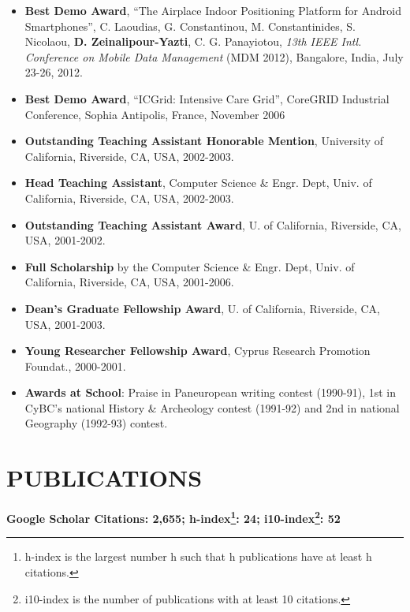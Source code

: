 \documentclass[10pt]{article}
\begin{document}
\begin{itemize}
\item  {\bf Best Demo Award}, ``The Airplace Indoor Positioning Platform for Android Smartphones'', C. Laoudias, G. Constantinou, M. Constantinides, S. Nicolaou, {\bf D. Zeinalipour-Yazti}, C. G. Panayiotou, {\em 13th IEEE Intl. Conference on Mobile Data Management}  (MDM 2012), Bangalore, India, July 23-26, 2012.
\item   {\bf Best Demo Award}, ``ICGrid: Intensive Care Grid'',
CoreGRID Industrial Conference, Sophia Antipolis, France,  November 2006
\item  {\bf Outstanding Teaching Assistant Honorable Mention}, University of California, Riverside, CA, USA,		2002-2003.
\item  {\bf Head Teaching Assistant}, Computer Science \& Engr. Dept, Univ. of California, Riverside, CA, USA,    2002-2003.
\item  {\bf Outstanding Teaching Assistant Award}, U. of California, Riverside, CA, USA, 			2001-2002.
\item  {\bf Full Scholarship} by the Computer Science \& Engr. Dept, Univ. of California, Riverside, CA, USA,	2001-2006.
\item  {\bf Dean's Graduate Fellowship Award}, U. of California, Riverside, CA, USA,				2001-2003.
\item  {\bf Young Researcher Fellowship Award}, Cyprus Research Promotion Foundat.,	2000-2001.
\item  {\bf Awards at School}: Praise in Paneuropean writing
contest (1990-91), 1st in CyBC's national History \& Archeology contest (1991-92) and
2nd in national Geography (1992-93) contest.
\end{itemize}

\newpage

\section{PUBLICATIONS}
{\bf Google Scholar Citations: 2,655;
h-index\footnote{h-index is the largest number h such that h publications have at least h citations.}: 24;
i10-index\footnote{i10-index is the number of publications with at least 10 citations.}: 52}
\end{document}
